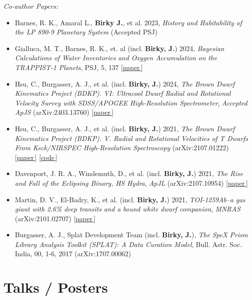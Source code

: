 \documentclass[a4,11pt]{article}
\let\orighref\href
\renewcommand{\href}[2]{\orighref{#1}{#2\,\scriptsize\faExternalLink}}
\begin{document}
\textsl{Co-author Papers:} 
\begin{itemize}[itemsep=0pt]
    \item Barnes, R. K., Amaral L., \textbf{Birky J.}, et al. 2023, \textsl{History and Habitability of the LP 890-9 Planetary System} (Accepted PSJ) 
    \item Gialluca, M. T., Barnes, R. K.,  et. al (incl. \textbf{Birky, J.}) 2024, \textsl{Bayesian Calculations of Water Inventories and Oxygen Accumulation on the TRAPPIST-1 Planets}, PSJ, 5, 137  [\href{https://iopscience.iop.org/article/10.3847/PSJ/ad4454/meta}{paper}]
    \item Hsu, C., Burgasser, A. J., et al. (incl. \textbf{Birky, J.}) 2024, \textsl{The Brown Dwarf Kinematics Project (BDKP). VI: Ultracool Dwarf Radial and Rotational Velocity Survey with SDSS/APOGEE High-Resolution Spectrometer}, \textit{Accepted ApJS} (arXiv:2403.13760) [\href{https://arxiv.org/abs/2403.13760}{paper}]
    \item Hsu, C., Burgasser, A. J., et al. (incl. \textbf{Birky, J.}) 2021, \textsl{The Brown Dwarf Kinematics Project (BDKP). V. Radial and Rotational Velocities of T Dwarfs From Keck/NIRSPEC High-Resolution Spectroscopy} (arXiv:2107.01222)  [\href{https://arxiv.org/abs/2107.01222}{paper}] [\href{https://github.com/chihchunhsu/smart}{code}] 
    \item Davenport, J. R. A., Windemuth, D., et al. (incl. \textbf{Birky, J.}) 2021, \textsl{The Rise and Fall of the Eclipsing Binary, HS Hydra}, \textit{ApJL} (arXiv:2107.10954) [\href{https://arxiv.org/abs/2107.10954}{paper}] 
    \item Martin, D. V., El-Badry, K., et al. (incl. \textbf{Birky, J.}) 2021, \textsl{TOI-1259Ab--a gas giant with 2.6\% deep transits and a bound white dwarf companion}, \textit{MNRAS} (arXiv:2101.02707) [\href{https://arxiv.org/abs/2101.02707}{paper}]
    \item Burgasser, A. J., Splat Development Team (incl. \textbf{Birky, J.}), \textsl{The SpeX Prism Library Analysis Toolkit (SPLAT): A Data Curation Model}, Bull. Astr. Soc. India, 00, 1-6, 2017 (arXiv:1707.00062)
\end{itemize}


\section{Talks / Posters}
\end{document}
